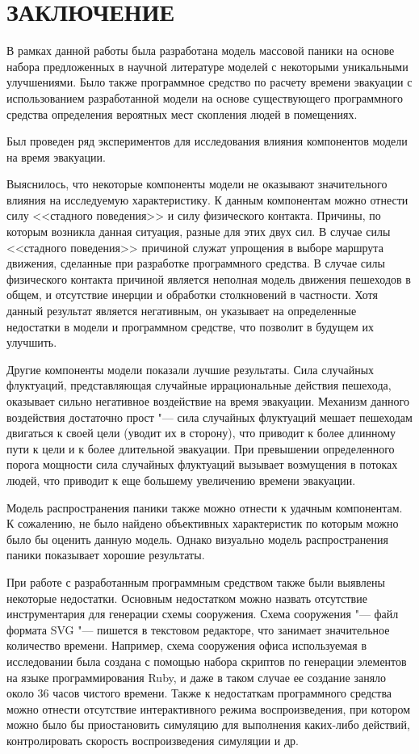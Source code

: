 \chapter*{ЗАКЛЮЧЕНИЕ}

\label{sec:final}

В рамках данной работы была разработана модель массовой паники на основе набора предложенных в научной литературе моделей
с некоторыми уникальными улучшениями.
Было также программное средство по расчету времени эвакуации с использованием разработанной модели на основе существующего
программного средства определения вероятных мест скопления людей в помещениях.

Был проведен ряд экспериментов для исследования влияния компонентов модели на время эвакуации.

Выяснилось, что некоторые компоненты модели не оказывают значительного влияния на исследуемую характеристику.
К данным компонентам можно отнести силу <<стадного поведения>> и силу физического контакта.
Причины, по которым возникла данная ситуация, разные для этих двух сил.
В случае силы <<стадного поведения>> причиной служат упрощения в выборе маршрута движения,
сделанные при разработке программного средства.
В случае силы физического контакта причиной является неполная модель движения пешеходов в общем,
и отсутствие инерции и обработки столкновений в частности.
Хотя данный результат является негативным, он указывает на определенные недостатки в модели и программном
средстве, что позволит в будущем их улучшить.

Другие компоненты модели показали лучшие результаты.
Сила случайных флуктуаций, представляющая случайные иррациональные действия пешехода,
оказывает сильно негативное воздействие на время эвакуации.
Механизм данного воздействия достаточно прост "--- сила случайных флуктуаций мешает
пешеходам двигаться к своей цели (уводит их в сторону), что приводит к более длинному пути
к цели и к более длительной эвакуации. При превышении определенного порога мощности
сила случайных флуктуаций вызывает возмущения в потоках людей, что приводит к еще большему
увеличению времени эвакуации.

Модель распространения паники также можно отнести к удачным компонентам.
К сожалению, не было найдено объективных характеристик по которым можно было бы оценить данную модель.
Однако визуально модель распространения паники показывает хорошие результаты.

При работе с разработанным программным средством также были выявлены некоторые недостатки.
Основным недостатком можно назвать отсутствие инструментария для генерации схемы сооружения.
Схема сооружения "--- файл формата SVG "--- пишется в текстовом редакторе, что занимает значительное количество времени.
Например, схема сооружения офиса используемая в исследовании была создана с помощью набора скриптов по генерации элементов
на языке программирования Ruby, и даже в таком случае ее создание заняло около 36 часов чистого времени.
Также к недостаткам программного средства можно отнести отсутствие интерактивного режима воспроизведения,
при котором можно было бы приостановить симуляцию для выполнения каких-либо действий, контролировать скорость
воспроизведения симуляции и др.

